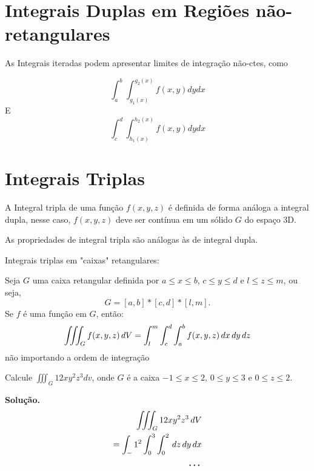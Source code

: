 \documentclass[portugues, 11pt]{article}
\begin{document}
	
	\section{Integrais Duplas em Regiões não-retangulares}
	As Integrais iteradas podem apresentar limites de integração não-ctes, como
	
	\begin{equation}
		\int_a^b\int_{g_{1}(x)}^{g_{2}(x)}{f(x,y) dydx}
	\end{equation}
	E
	\begin{equation}
		\int_c^d\int_{h_{1}(x)}^{h_{2}(x)}{f(x,y) dydx}
	\end{equation}
	
	
	\section{Integrais Triplas}
	A Integral tripla de uma função $f(x,y,z)$ é definida de forma análoga a integral dupla, nesse caso, $f(x,y,z)$ deve ser contínua em um sólido $G$ do espaço 3D.

	As propriedades de integral tripla são análogas às de integral dupla.

	Integrais triplas em "caixas" retangulares:

	\begin{thrm}
		Seja $G$ uma caixa retangular definida por $a\leq x \leq b$, $c \leq y \leq d$ e $l \leq z \leq m$, ou seja, 
		\begin{equation}
			G = [a,b]*[c,d]*[l,m].
		\end{equation}
		Se $f$ é uma função em $G$, então:
		\begin{equation}
			\iiint_G f(x,y,z) \,dV  \\
			= \int_l^m\int_c^d\int_a^b f(x,y,z) \,dx\,dy\,dz
		\end{equation}
		não importando a ordem de integração
	\end{thrm}

	\begin{exmp}
		Calcule $ \iiint_G {12xy^2z^3}{dv}$, onde $G$ é a caixa $-1 \leq x \leq 2$, $0 \leq y \leq 3$ e $0 \leq z \leq 2$.
		
		\textbf{Solução.}
		\begin{align*}
			\iiint_G 12xy^2z^3 \,dV \\
			= \int_-1^2\int_0^3\int_0^2 \,dz\,dy\,dx \\
			\textbf{\dots}
		\end{align*}
		

	\end{exmp}
	
\end{document}
